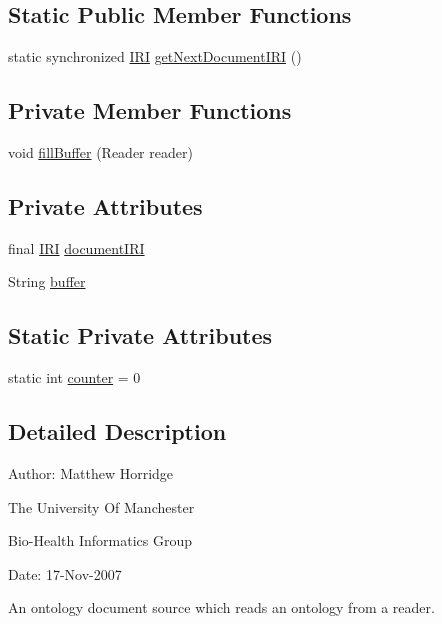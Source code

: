 \subsection*{Static Public Member Functions}
\begin{DoxyCompactItemize}
\item 
static synchronized \hyperlink{classorg_1_1semanticweb_1_1owlapi_1_1model_1_1_i_r_i}{I\-R\-I} \hyperlink{classorg_1_1semanticweb_1_1owlapi_1_1io_1_1_reader_document_source_a714a5d0ff4fc4db89851ce1e2e899fca}{get\-Next\-Document\-I\-R\-I} ()
\end{DoxyCompactItemize}
\subsection*{Private Member Functions}
\begin{DoxyCompactItemize}
\item 
void \hyperlink{classorg_1_1semanticweb_1_1owlapi_1_1io_1_1_reader_document_source_abd1063adb68eed2f68e4e6df4f59b498}{fill\-Buffer} (Reader reader)
\end{DoxyCompactItemize}
\subsection*{Private Attributes}
\begin{DoxyCompactItemize}
\item 
final \hyperlink{classorg_1_1semanticweb_1_1owlapi_1_1model_1_1_i_r_i}{I\-R\-I} \hyperlink{classorg_1_1semanticweb_1_1owlapi_1_1io_1_1_reader_document_source_ace78abe4870c84ff075477da9c242475}{document\-I\-R\-I}
\item 
String \hyperlink{classorg_1_1semanticweb_1_1owlapi_1_1io_1_1_reader_document_source_ad5f184ffb876a9e6f20606d70ece13af}{buffer}
\end{DoxyCompactItemize}
\subsection*{Static Private Attributes}
\begin{DoxyCompactItemize}
\item 
static int \hyperlink{classorg_1_1semanticweb_1_1owlapi_1_1io_1_1_reader_document_source_a915906c985f84e86dfb165bd6cdd5070}{counter} = 0
\end{DoxyCompactItemize}


\subsection{Detailed Description}
Author\-: Matthew Horridge\par
 The University Of Manchester\par
 Bio-\/\-Health Informatics Group\par
 Date\-: 17-\/\-Nov-\/2007\par
 \par
 An ontology document source which reads an ontology from a reader. 

